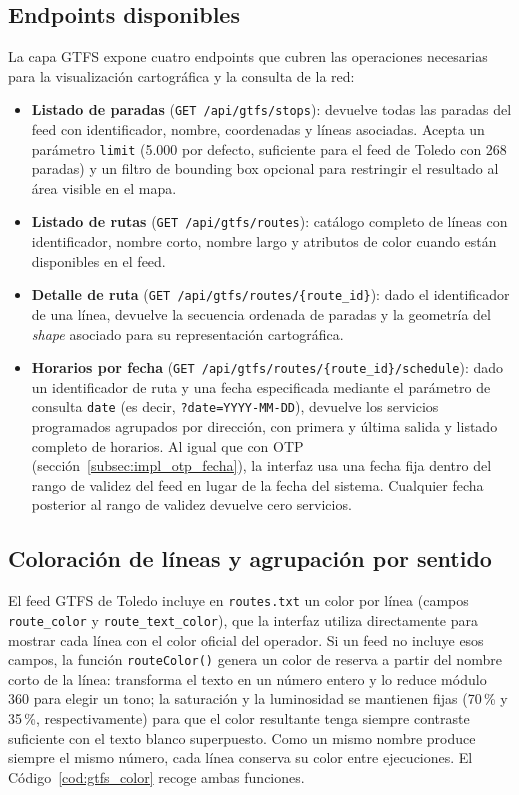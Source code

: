 \subsection{Endpoints disponibles}
\label{subsec:impl_gtfs_endpoints}

La capa GTFS expone cuatro endpoints que cubren las operaciones necesarias para la visualización cartográfica y la consulta de la red:

\begin{itemize}
   \item \textbf{Listado de paradas} (\texttt{GET /api/gtfs/stops}): devuelve todas las paradas del feed con identificador, nombre, coordenadas y líneas asociadas. Acepta un parámetro \texttt{limit} (5.000 por defecto, suficiente para el feed de Toledo con 268 paradas) y un filtro de bounding box opcional para restringir el resultado al área visible en el mapa.

  \item \textbf{Listado de rutas} (\texttt{GET /api/gtfs/routes}): catálogo completo de líneas con identificador, nombre corto, nombre largo y atributos de color cuando están disponibles en el feed.

  \item \textbf{Detalle de ruta} (\texttt{GET /api/gtfs/routes/\{route\_id\}}): dado el identificador de una línea, devuelve la secuencia ordenada de paradas y la geometría del \textit{shape} asociado para su representación cartográfica.

\item \textbf{Horarios por fecha} (\texttt{GET /api/gtfs/routes/\{route\_id\}/schedule}): dado un identificador de ruta y una fecha especificada mediante el parámetro de consulta \texttt{date} (es decir, \texttt{?date=YYYY-MM-DD}), devuelve los servicios programados agrupados por dirección, con primera y última salida y listado completo de horarios. Al igual que con OTP (sección~\ref{subsec:impl_otp_fecha}), la interfaz usa una fecha fija dentro del rango de validez del feed en lugar de la fecha del sistema. Cualquier fecha posterior al rango de validez devuelve cero servicios.
\end{itemize}


\subsection{Coloración de líneas y agrupación por sentido}
\label{subsec:impl_gtfs_color}

El feed GTFS de Toledo incluye en \texttt{routes.txt} un color por línea (campos \texttt{route\_color} y \texttt{route\_text\_color}), que la interfaz utiliza directamente para mostrar cada línea con el color oficial del operador. Si un feed no incluye esos campos, la función \texttt{routeColor()} genera un color de reserva a partir del nombre corto de la línea: transforma el texto en un número entero y lo reduce módulo 360 para elegir un tono; la saturación y la luminosidad se mantienen fijas (70\,\% y 35\,\%, respectivamente) para que el color resultante tenga siempre contraste suficiente con el texto blanco superpuesto. Como un mismo nombre produce siempre el mismo número, cada línea conserva su color entre ejecuciones. El Código~\ref{cod:gtfs_color} recoge ambas funciones.

